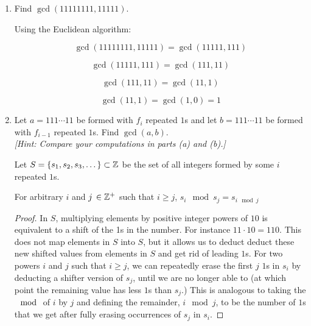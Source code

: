 \begin{problem}
\begin{enumerate}
\item Find $\gcd(11111111,11111)$.

\begin{Answer}
\setcounter{equation}{0}

Using the Euclidean algorithm:

\begin{equation}
  \gcd(11111111,11111) = \gcd(11111, 111)
\end{equation}

\begin{equation}
  \gcd(11111, 111) = \gcd(111, 11)
\end{equation}

\begin{equation}
  \gcd(111, 11) = \gcd(11, 1)
\end{equation}

\begin{equation}
  \gcd(11, 1) = \gcd(1, 0) = 1
\end{equation}
\end{Answer}

\newpage
\item Let $a=111\cdots 11$ be formed with $f_i$ repeated $1$s and let $b=111\cdots 11$ be formed with $f_{i-1}$ repeated $1$s.
Find $\gcd(a,b)$.  \\\emph{[Hint: Compare your computations in parts (a) and (b).]}

\begin{Answer}
\setcounter{equation}{0}

Let $S = \{s_{1}, s_{2}, s_{3}, \dots\} \subset \mathbb{Z}$ be the set of all integers formed by some $i$ repeated $1$s.

\noindent
For arbitrary $i$ and $j\, \in \mathbb{Z}^+$ such that $i \ge j$, $s_{i} \mod s_{j} = s_{i \mod j}$

\begin{proof}
\vspace{3pt}
\indent
In $S$, multiplying elements by positive integer powers of $10$ is equivalent to a shift of the 1s in the number.
For instance $11 \cdot 10 = 110$. This does not map elements in $S$ into $S$,
but it allows us to deduct deduct these new shifted values from elements in $S$ and
get rid of leading $1$s. For two powers $i$ and $j$ such that $i \ge j$,
we can repeatedly erase the first $j$ $1$s in $s_{i}$ by deducting a shifter version of $s_{j}$,
until we are no longer able to (at which point the remaining value has less $1$s than $s_{j}$.)
This is analogous to taking the $\mod$ of $i$ by $j$ and defining the remainder, $i \mod j$,
to be the number of $1$s that we get after fully erasing occurrences of $s_{j}$ in $s_{i}$.


\end{proof}
\end{Answer}
\end{enumerate}
\end{problem}
